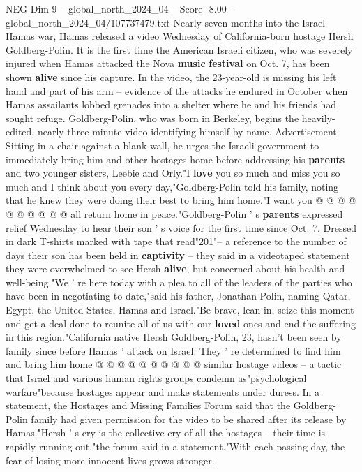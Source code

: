 \begin{textsample}{NEG Dim 9 – global\_north\_2024\_04 – Score -8.00 – global\_north\_2024\_04/107737479.txt}  \label{ex:f9_neg_266}
Nearly seven months into the Israel-Hamas war, Hamas released a video Wednesday of California-born hostage Hersh Goldberg-Polin.
It is the first time the American Israeli citizen, who was severely injured when Hamas attacked the Nova \textbf{music} \textbf{festival} on Oct. 7, has been shown \textbf{alive} since his capture.
In the video, the 23-year-old is missing his left hand and part of his arm -- evidence of the attacks he endured in October when Hamas assailants lobbed grenades into a shelter where he and his friends had sought refuge.
Goldberg-Polin, who was born in Berkeley, begins the heavily-edited, nearly three-minute video identifying himself by name.
Advertisement Sitting in a chair against a blank wall, he urges the Israeli government to immediately bring him and other hostages home before addressing his \textbf{parents} and two younger sisters, Leebie and Orly."I \textbf{love} you so much and miss you so much and I think about you every day,"Goldberg-Polin told his family, noting that he knew they were doing their best to bring him home."I want you @ @ @ @ @ @ @ @ @ @ all return home in peace."Goldberg-Polin ' s \textbf{parents} expressed relief Wednesday to hear their son ' s voice for the first time since Oct. 7.
Dressed in dark T-shirts marked with tape that read"201"-- a reference to the number of days their son has been held in \textbf{captivity} -- they said in a videotaped statement they were overwhelmed to see Hersh \textbf{alive}, but concerned about his health and well-being."We ' re here today with a plea to all of the leaders of the parties who have been in negotiating to date,"said his father, Jonathan Polin, naming Qatar, Egypt, the United States, Hamas and Israel."Be brave, lean in, seize this moment and get a deal done to reunite all of us with our \textbf{loved} ones and end the suffering in this region."California native Hersh Goldberg-Polin, 23, hasn't been seen by family since before Hamas ' attack on Israel.
They ' re determined to find him and bring him home @ @ @ @ @ @ @ @ @ @ similar hostage videos -- a tactic that Israel and various human rights groups condemn as"psychological warfare"because hostages appear and make statements under duress.
In a statement, the Hostages and Missing Families Forum said that the Goldberg-Polin family had given permission for the video to be shared after its release by Hamas."Hersh ' s cry is the collective cry of all the hostages -- their time is rapidly running out,"the forum said in a statement."With each passing day, the fear of losing more innocent lives grows stronger.

\end{textsample}
